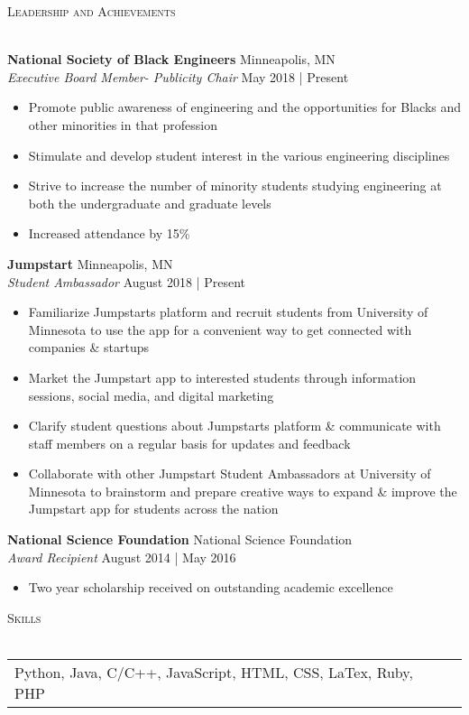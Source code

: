 \documentclass[a4paper]{article}
\newcommand{\lineunder} {
	\vspace*{-8pt} \\
	\hspace*{-18pt} \hrulefill \\
}
\newcommand{\header} [1] {
	{\hspace*{-18pt}\vspace*{6pt} \textsc{#1}}
	\vspace*{-6pt} \lineunder
}
\begin{document}
\header{Leadership and Achievements}
\vspace{1mm}

	\textbf{National Society of Black Engineers} \hfill Minneapolis, MN\\
	\textit{Executive Board Member- Publicity Chair} \hfill May 2018 | Present\\
	\vspace{-1mm}
	\begin{itemize} \itemsep 1pt
		\item Promote public awareness of engineering and the opportunities for Blacks and other minorities in that profession
		\item Stimulate and develop student interest in the various engineering disciplines
		\item Strive to increase the number of minority students studying engineering at both the undergraduate and graduate levels 
		\item Increased attendance by 15\%
	\end{itemize}
	\textbf{Jumpstart} \hfill Minneapolis, MN\\
	\textit{Student Ambassador} \hfill August 2018 | Present\\
	\vspace{-1mm}
	\begin{itemize} \itemsep 1pt
		\item Familiarize Jumpstart\textquotesingle{}s platform and recruit students from University of Minnesota to use the app for a convenient way to get connected with companies \& startups
		\item Market the Jumpstart app to interested students through information sessions, social media, and digital marketing
		\item Clarify student questions about Jumpstart\textquotesingle{}s platform \& communicate with staff members on a regular basis for updates and feedback
		\item Collaborate with other Jumpstart Student Ambassadors at University of Minnesota to brainstorm and prepare creative ways to expand \& improve the Jumpstart app for students across the nation
	\end{itemize}
	\textbf{National Science Foundation} \hfill National Science Foundation\\
	\textit{Award Recipient} \hfill August 2014 | May 2016\\
	\vspace{-1mm}
	\begin{itemize} \itemsep 1pt
		\item Two year scholarship received on outstanding academic excellence
	\end{itemize}
	
	\header{Skills}
	\begin{tabular}{ l l }
		Python, Java, C/C++, JavaScript, HTML, CSS, LaTex, Ruby, PHP   \\
	\end{tabular}
	\vspace{2mm}
	
	\ 
\end{document}
